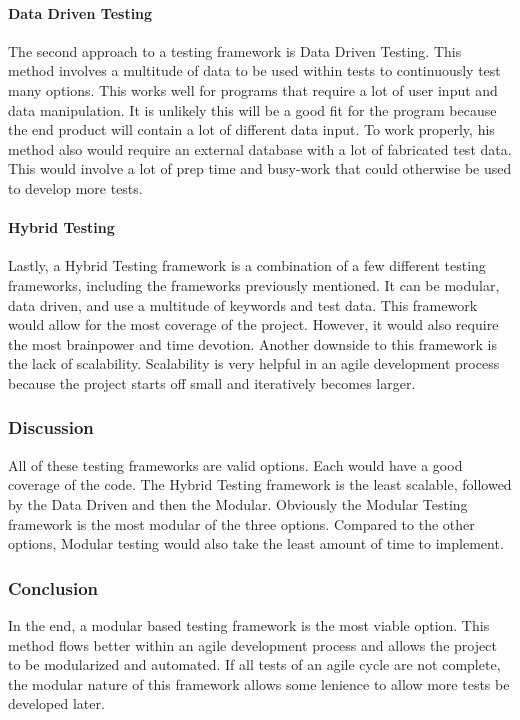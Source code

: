 \paragraph{Data Driven Testing}
The second approach to a testing framework is Data Driven Testing. This method involves a multitude of data to be used within tests to continuously test many options. This works well for programs that require a lot of user input and data manipulation. It is unlikely this will be a good fit for the program because the end product will contain a lot of different data input. To work properly, his method also would require an external database with a lot of fabricated test data. This would involve a lot of prep time and busy-work that could otherwise be used to develop more tests.
\paragraph{Hybrid Testing}
Lastly, a Hybrid Testing framework is a combination of a few different testing frameworks, including the frameworks previously mentioned. It can be modular, data driven, and use a multitude of keywords and test data. This framework would allow for the most coverage of the project. However, it would also require the most brainpower and time devotion. Another downside to this framework is the lack of scalability. Scalability is very helpful in an agile development process because the project starts off small and iteratively becomes larger.
\subsubsection{Discussion}
All of these testing frameworks are valid options. Each would have a good coverage of the code. The Hybrid Testing framework is the least scalable, followed by the Data Driven and then the Modular. Obviously the Modular Testing framework is the most modular of the three options. Compared to the other options, Modular testing would also take the least amount of time to implement.

\subsubsection{Conclusion}
In the end, a modular based testing framework is the most viable option. This method flows better within an agile development process and allows the project to be modularized and automated. If all tests of an agile cycle are not complete, the modular nature of this framework allows some lenience to allow more tests be developed later.\cite{Software_Testing_Help}
\newpage

